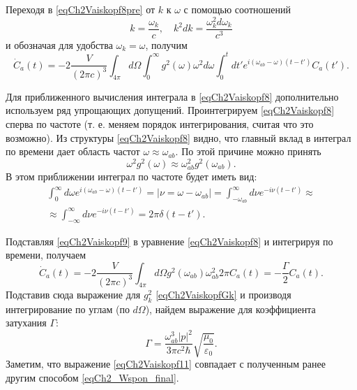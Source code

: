 Переходя в \eqref{eqCh2Vaiskopf8pre} от $k$ к $\omega$ с помощью соотношений 
\begin{equation}
k = \frac{\omega_k}{c}, \quad k^2 dk = \frac{\omega_k^2 d \omega_k}{c^3}
\nonumber
\end{equation}
и обозначая для удобства \(\omega_k = \omega\),
получим
\begin{equation}
\dot{C}_{a}\left(t\right) = - 
2 \frac{V}{\left(2 \pi c\right)^3} \int_{4\pi}d \Omega \int_0^{\infty}
g^2\left(\omega\right) \omega^2 d\omega  \int_0^t dt'
e^{i \left(\omega_{ab} - \omega\right)\left(t - t'\right)}  
C_{a}\left(t'\right).
\label{eqCh2Vaiskopf8}
\end{equation}

Для приближенного вычисления интеграла в \eqref{eqCh2Vaiskopf8}
дополнительно используем ряд упрощающих допущений.
Проинтегрируем \eqref{eqCh2Vaiskopf8} сперва по частоте (т. е. меняем
порядок интегрирования, считая что это возможно). Из структуры 
\eqref{eqCh2Vaiskopf8} видно, что главный вклад в интеграл по времени
дает область частот $\omega \approx \omega_{ab}$. По этой причине
можно принять 
\[
\omega^2 g^2\left(\omega\right) \approx 
\omega_{ab}^2 g^2\left(\omega_{ab}\right).
\]
В этом приближении интеграл по частоте будет иметь вид:
\begin{eqnarray}
\int_0^{\infty}d \omega e^{i\left(\omega_{ab} - \omega\right)\left(t -
  t'\right)}  = \left|\nu = \omega - \omega_{ab}\right| =
\int_{- \omega_{ab}}^{\infty}d \nu e^{-i \nu\left(t - t'\right)} \approx
\nonumber \\
\approx \int_{- \infty}^{\infty} d \nu e^{-i \nu\left(t - t'\right)} = 
2 \pi \delta\left(t - t'\right).
\label{eqCh2Vaiskopf9}
\end{eqnarray}

Подставляя \eqref{eqCh2Vaiskopf9} в уравнение \eqref{eqCh2Vaiskopf8} и
интегрируя по времени, получаем
\begin{equation}
\dot{C}_{a}\left(t\right) = - 
2 \frac{V}{\left(2 \pi c\right)^3} \int_{4\pi}d \Omega 
g^2\left(\omega_{ab}\right) \omega_{ab}^2   
2 \pi C_{a}\left(t\right) = - \frac{\Gamma}{2} C_{a}\left(t\right).
\label{eqCh2Vaiskopf10}
\end{equation}
Подставив сюда выражение для $g_k^2$ \eqref{eqCh2VaiskopfGk} и
производя интегрирование по углам (по $d \Omega$), найдем выражение для
коэффициента затухания $\Gamma$:
\begin{equation}
\Gamma = \frac{\omega_{ab}^3 \left|p\right|^2}{3 \pi c^2 \hbar}
\sqrt{\frac{\mu_0}{\varepsilon_0}}. 
\label{eqCh2Vaiskopf11}
\end{equation}
Заметим, что выражение \eqref{eqCh2Vaiskopf11} совпадает с полученным
ранее другим способом \eqref{eqCh2_Wspon_final}.

